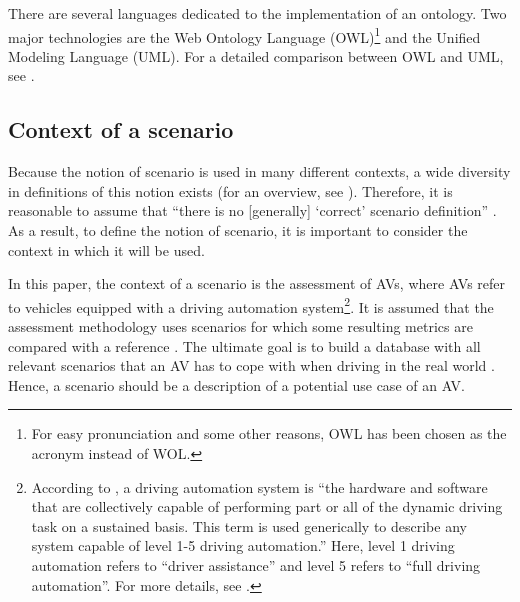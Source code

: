 There are several languages dedicated to the implementation of an ontology. Two major technologies are the Web Ontology Language (OWL)\footnote{For easy pronunciation and some other reasons, OWL has been chosen as the acronym instead of WOL.} and the Unified Modeling Language (UML). 
For a detailed comparison between OWL and UML, see \cite{kiko2005detailed}.



\subsection{Context of a scenario}
\label{sec:context}

Because the notion of scenario is used in many different contexts, a wide diversity in definitions of this notion exists (for an overview, see \cite{vannotten2003updated, bishop2007scentechniques}). Therefore, it is reasonable to assume that ``there is no [generally] `correct' scenario definition'' \cite{vannotten2003updated}. As a result, to define the notion of scenario, it is important to consider the context in which it will be used. 

In this paper, the context of a scenario is the assessment of AVs, where AVs refer to vehicles equipped with a driving automation system\footnote{According to \cite{sae2018j3016}, a driving automation system is ``the hardware and software that are collectively capable of performing part or all of the dynamic driving task on a sustained basis. This term is used generically to describe any system capable of level 1-5 driving automation.'' Here, level 1 driving automation refers to ``driver assistance'' and level 5 refers to ``full driving automation''. For more details, see \cite{sae2018j3016}.}. 
It is assumed that the assessment methodology uses scenarios %
for which some resulting metrics are compared with a reference \cite{stellet2015taxonomy}. 
The ultimate goal is to build a database with all relevant scenarios that an AV has to cope with when driving in the real world \cite{putz2017pegasus}. Hence, a scenario should be a description of a potential use case of an AV. 

